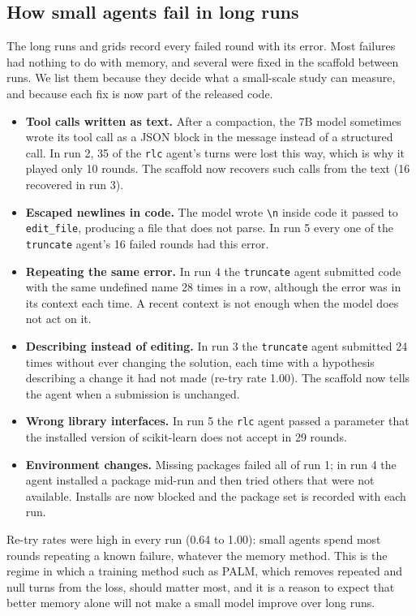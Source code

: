 \documentclass[11pt]{article}
\newcommand{\code}[1]{\texttt{#1}}
\begin{document}
\subsection{How small agents fail in long runs}
\label{sec:failures}
The long runs and grids record every failed round with its error. Most failures had nothing to do with memory, and several were fixed in the scaffold between runs. We list them because they decide what a small-scale study can measure, and because each fix is now part of the released code.

\begin{itemize}
  \item \textbf{Tool calls written as text.} After a compaction, the 7B model sometimes wrote its tool call as a JSON block in the message instead of a structured call. In run 2, 35 of the \code{rlc} agent's turns were lost this way, which is why it played only 10 rounds. The scaffold now recovers such calls from the text (16 recovered in run 3).
  \item \textbf{Escaped newlines in code.} The model wrote \code{\textbackslash n} inside code it passed to \code{edit\_file}, producing a file that does not parse. In run 5 every one of the \code{truncate} agent's 16 failed rounds had this error.
  \item \textbf{Repeating the same error.} In run 4 the \code{truncate} agent submitted code with the same undefined name 28 times in a row, although the error was in its context each time. A recent context is not enough when the model does not act on it.
  \item \textbf{Describing instead of editing.} In run 3 the \code{truncate} agent submitted 24 times without ever changing the solution, each time with a hypothesis describing a change it had not made (re-try rate 1.00). The scaffold now tells the agent when a submission is unchanged.
  \item \textbf{Wrong library interfaces.} In run 5 the \code{rlc} agent passed a parameter that the installed version of scikit-learn does not accept in 29 rounds.
  \item \textbf{Environment changes.} Missing packages failed all of run 1; in run 4 the agent installed a package mid-run and then tried others that were not available. Installs are now blocked and the package set is recorded with each run.
\end{itemize}

Re-try rates were high in every run (0.64 to 1.00): small agents spend most rounds repeating a known failure, whatever the memory method. This is the regime in which a training method such as PALM, which removes repeated and null turns from the loss, should matter most, and it is a reason to expect that better memory alone will not make a small model improve over long runs.
\end{document}
